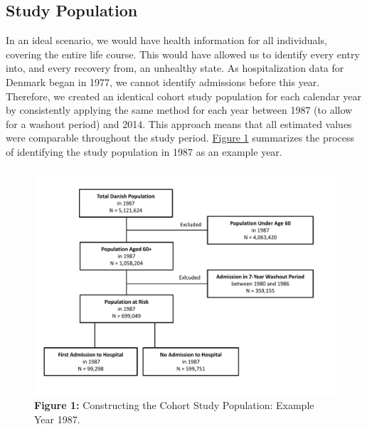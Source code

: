 \subsection{Study Population}

In an ideal scenario, we would have health information for all individuals, 
covering the entire life course. This would have allowed us to identify every 
entry into, and every recovery from, an unhealthy state. As hospitalization 
data for Denmark began in 1977, we cannot identify admissions before this year. 
Therefore, we created an identical cohort study population for each calendar 
year by consistently applying the same method for each year between 1987 
(to allow for a washout period) and 2014. This approach means that all estimated 
values were comparable throughout the study period. \hyperref[ch4:fig1]{Figure 1} summarizes the 
process of identifying the study population in 1987 as an example year.\\

	\begin{figure}[H]
		\centering
		\includegraphics[scale=0.60]{Paper_3/Figure_1.pdf}
		\caption*{\textbf{Figure 1:} 	Constructing the Cohort Study Population: 
										Example Year 1987.}
	\label{ch4:fig1}
	\end{figure}



